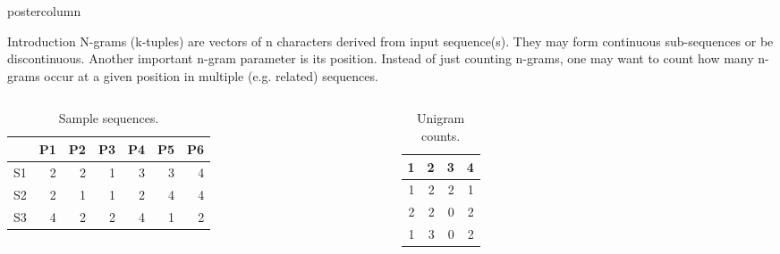 \documentclass[final]{beamer}\usepackage[]{graphicx}\usepackage[]{color}
\newlength{\columnheight}
\begin{document}
\begin{frame}
  \begin{columns}
    \begin{column}{.49\textwidth}
      \begin{beamercolorbox}[center,wd=\textwidth]{postercolumn}
        \begin{minipage}[T]{.95\textwidth}
          \parbox[t][\columnheight]{\textwidth}
            {
    
        
    \begin{block}{Introduction}
      N-grams (k-tuples) are vectors of n characters derived from input sequence(s). They may form continuous sub-sequences or be discontinuous. Another important n-gram parameter is its position. Instead of just counting n-grams, one may want to count how many n-grams occur at a given position in multiple (e.g. related) sequences.

\small{
       \begin{columns}[c] %
\begin{table}[ht]
\centering
\begin{tabular}{rrrrrrr}
  \hline
 & P1 & P2 & P3 & P4 & P5 & P6 \\ 
  \hline
S1 & 2 & 2 & 1 & 3 & 3 & 4 \\ 
  S2 & 2 & 1 & 1 & 2 & 4 & 4 \\ 
  S3 & 4 & 2 & 2 & 4 & 1 & 2 \\ 
   \hline
\end{tabular}
\caption{Sample sequences.} 
\end{table}

      
      

    
\begin{table}[ht]
\centering
\begin{tabular}{rrrr}
  \hline
1 & 2 & 3 & 4 \\ 
  \hline
1 & 2 & 2 & 1 \\ 
  2 & 2 & 0 & 2 \\ 
  1 & 3 & 0 & 2 \\ 
   \hline
\end{tabular}
\caption{Unigram counts.} 
\end{table}



\end{columns}}
\end{block}}
\end{minipage}
\end{beamercolorbox}
\end{column}
\end{columns}
\end{frame}
\end{document}
